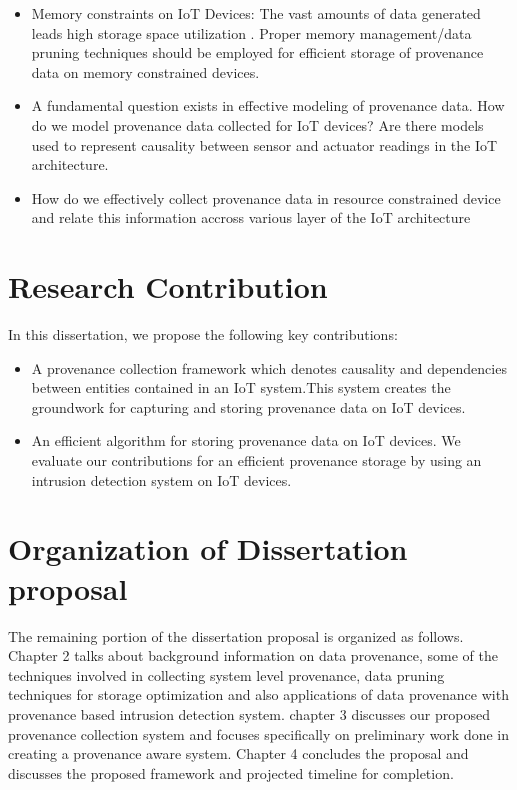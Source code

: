 \begin{itemize}

\item Memory constraints on IoT Devices: The vast amounts of data generated leads high storage space utilization . Proper memory management/data pruning techniques should be employed for efficient storage of provenance data on memory constrained devices. 

\item A fundamental question exists in effective modeling of provenance data. How do we model provenance data collected for IoT devices? Are there models used to represent causality between sensor and actuator readings in the IoT architecture.

\item How do we effectively collect provenance data in resource constrained device and relate this information accross various layer of the IoT architecture

\end{itemize}

\section{Research Contribution}

In this dissertation, we propose the following key contributions:

\begin{itemize}
  \item A provenance collection framework which denotes causality and dependencies between entities contained in an IoT system.This system creates the groundwork for capturing and storing provenance data  on IoT devices.
  \item An efficient algorithm for storing provenance data on IoT devices. We evaluate our contributions for an efficient provenance storage by using an intrusion detection system on IoT devices.
\end{itemize}

\section{Organization of Dissertation proposal}

The remaining portion of the dissertation proposal is organized as follows.  Chapter 2 talks about background information on data provenance, some of the techniques involved in collecting system level provenance, data pruning techniques for storage optimization and also applications of data provenance with provenance based intrusion detection system. chapter 3 discusses our proposed provenance collection system and focuses specifically on preliminary work done in creating a provenance aware system. Chapter 4 concludes the proposal and discusses the proposed framework and projected timeline for completion.

